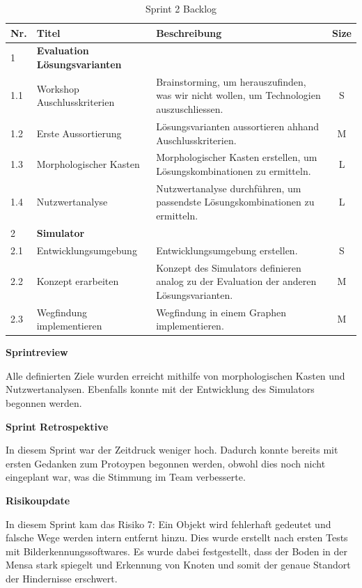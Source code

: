 \begin{table}[H]
\centering
\small
\begin{tabularx}{\textwidth}{|l|l|X|c|}
\hline
  \textbf{Nr.} & \textbf{Titel} & \textbf{Beschreibung} & \textbf{Size}\\
  \hline
  1  & \textbf{Evaluation Lösungsvarianten} &&\\
  \hline
  1.1  & Workshop Auschlusskriterien & Brainstorming, um herauszufinden, was wir nicht wollen, um Technologien auszuschliessen. & S\\
  \hline
  1.2 & Erste Aussortierung & Lösungsvarianten aussortieren ahhand Auschlusskriterien. & M\\
  \hline
  1.3 & Morphologischer Kasten & Morphologischer Kasten erstellen, um Lösungskombinationen zu ermitteln. & L\\
  \hline
  1.4 & Nutzwertanalyse & Nutzwertanalyse durchführen, um passendste Lösungskombinationen zu ermitteln. & L\\
  \hline
  2 & \textbf{Simulator} && \\
  \hline
  2.1 & Entwicklungsumgebung & Entwicklungsumgebung erstellen. & S \\
  \hline
  2.2 & Konzept erarbeiten & Konzept des Simulators definieren analog zu der Evaluation der anderen Lösungsvarianten. & M \\
  \hline
  2.3 & Wegfindung implementieren & Wegfindung in einem Graphen implementieren. & M \\
  \hline

\end{tabularx}
\caption{Sprint 2 Backlog}
\label{table:sprint2-backlog}
\end{table}

\textbf{Sprintreview}

Alle definierten Ziele wurden erreicht mithilfe von morphologischen Kasten und Nutzwertanalysen. Ebenfalls konnte mit der Entwicklung des Simulators begonnen werden.

\textbf{Sprint Retrospektive}

In diesem Sprint war der Zeitdruck weniger hoch. Dadurch konnte bereits mit ersten Gedanken zum Protoypen begonnen werden, obwohl dies noch nicht eingeplant war, was die Stimmung im Team verbesserte.

\textbf{Risikoupdate}

In diesem Sprint kam das Risiko 7: Ein Objekt wird fehlerhaft gedeutet und falsche Wege werden intern entfernt hinzu. Dies wurde erstellt nach ersten Tests mit Bilderkennungssoftwares. Es wurde dabei festgestellt, dass der Boden in der Mensa stark spiegelt und Erkennung von Knoten und somit der genaue Standort der Hindernisse erschwert.

